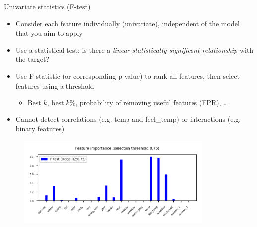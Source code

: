 \begin{frame}[allowframebreaks]{Univariate statistics (F-test)}
\begin{itemize}
    \item Consider each feature individually (univariate), independent of the model that you aim to apply
    \item Use a statistical test: is there a \textit{linear statistically significant relationship} with the target?
    \item Use F-statistic (or corresponding p value) to rank all features, then select features using a threshold
    \begin{itemize}
        \item Best $k$, best $k\%$, probability of removing useful features (FPR), \ldots
    \end{itemize}
    \item Cannot detect correlations (e.g. temp and feel\_temp) or interactions (e.g. binary features)
\end{itemize}

\begin{figure}
    \centering
    \includegraphics[width=0.85\textwidth,keepaspectratio]{images/pre-processing/F-test.png}
\end{figure}
\end{frame}

